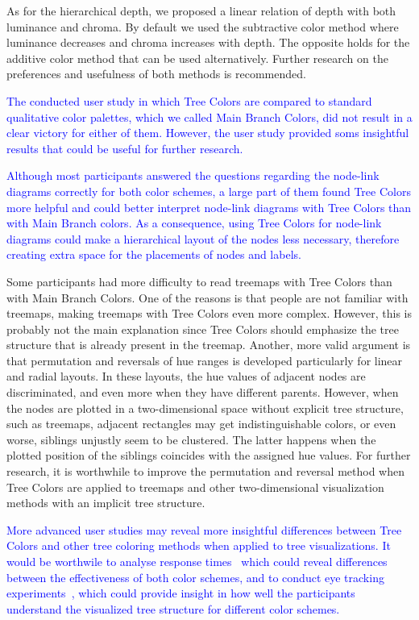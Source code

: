 \documentclass[review,journal]{vgtc}         %
\newcommand{\changedM}[1]{\textcolor{blue}{#1}}
\begin{document}
As for the hierarchical depth, we proposed a linear relation of depth with both luminance and chroma. By default we used the subtractive color method where luminance decreases and chroma increases with depth. The opposite holds for the additive color method that can be used alternatively. Further research on the preferences and usefulness of both methods is recommended.

\changedM{The conducted user study in which Tree Colors are compared to standard qualitative color palettes, which we called Main Branch Colors, did not result in a clear victory for either of them. However, the user study provided soms insightful results that could be useful for further research.}

\changedM{Although most participants answered the questions regarding the node-link diagrams correctly for both color schemes, a large part of them found Tree Colors more helpful and could better interpret node-link diagrams with Tree Colors than with Main Branch colors. As a consequence, using Tree Colors for node-link diagrams could make a hierarchical layout of the nodes less necessary, therefore creating extra space for the placements of nodes and labels.}

Some participants had more difficulty to read treemaps with Tree Colors than with Main Branch Colors. One of the reasons is that people are not familiar with treemaps, making treemaps with Tree Colors even more complex. However, this is probably not the main explanation since Tree Colors should emphasize the tree structure that is already present in the treemap. Another, more valid argument is that permutation and reversals of hue ranges is developed particularly for linear and radial layouts. In these layouts, the hue values of adjacent nodes are discriminated, and even more when they have different parents. However, when the nodes are plotted in a two-dimensional space without explicit tree structure, such as treemaps, adjacent rectangles may get indistinguishable colors, or even worse, siblings unjustly seem to be clustered. The latter happens when the plotted position of the siblings coincides with the assigned hue values. For further research, it is worthwhile to improve the permutation and reversal method when Tree Colors are applied to treemaps and other two-dimensional visualization methods with an implicit tree structure.

\changedM{More advanced user studies may reveal more insightful differences between Tree Colors and other tree coloring methods when applied to tree visualizations. 
It would be worthwile to analyse response times~\cite{wang06} which could reveal differences between the effectiveness of both color schemes, and to conduct eye tracking experiments~\cite{burch11}, which could provide insight in how well the participants understand the visualized tree structure for different color schemes.}
\end{document}
